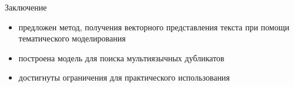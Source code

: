 \documentclass{beamer}
\begin{document}
\begin{frame}{Заключение}
    \begin{itemize}
        \item предложен метод, получения векторного представления текста при помощи тематического моделирования
        \item построена модель для поиска мультиязычных дубликатов
        \item достигнуты ограничения для практического использования
    \end{itemize}
\end{frame}


\end{document}
